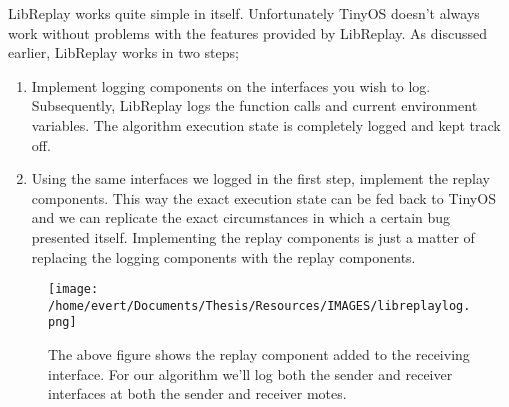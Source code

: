 LibReplay works quite simple in itself. Unfortunately TinyOS doesn't
always work without problems with the features provided by LibReplay. As
discussed earlier, LibReplay works in two steps;

\begin{enumerate}
\def\labelenumi{\arabic{enumi}.}
\itemsep1pt\parskip0pt
\item
  Implement logging components on the interfaces you wish to log.
  Subsequently, LibReplay logs the function calls and current
  environment variables. The algorithm execution state is completely
  logged and kept track off.
\item
  Using the same interfaces we logged in the first step, implement the
  replay components. This way the exact execution state can be fed back
  to TinyOS and we can replicate the exact circumstances in which a
  certain bug presented itself. Implementing the replay components is
  just a matter of replacing the logging components with the replay
  components.
\end{enumerate}

\begin{figure}[htbp]
\centering
\texttt{[image: /home/evert/Documents/Thesis/Resources/IMAGES/libreplaylog.png]}
\caption{The above figure shows the replay component added to the
receiving interface. For our algorithm we'll log both the sender and
receiver interfaces at both the sender and receiver motes.}
\end{figure}
